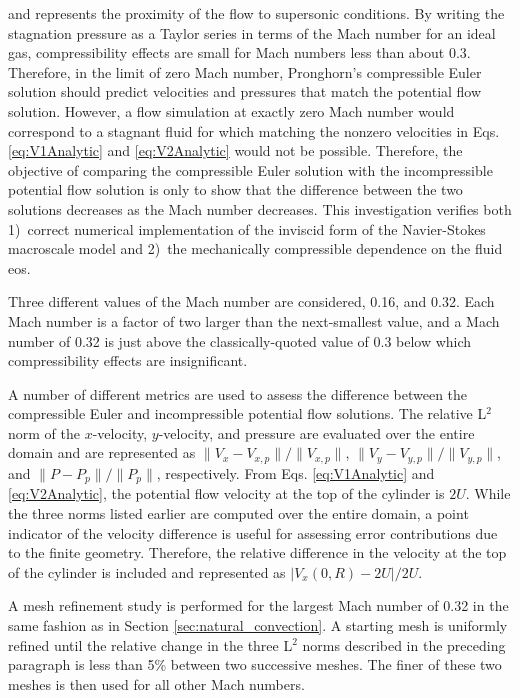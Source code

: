 \noindent and represents the proximity of the flow to supersonic conditions. By writing the stagnation pressure as a Taylor series in terms of the Mach number for an ideal gas, compressibility effects are small for Mach numbers less than about 0.3. Therefore, in the limit of zero Mach number, Pronghorn's compressible Euler solution should predict velocities and pressures that match the potential flow solution. However, a flow simulation at exactly zero Mach number would correspond to a stagnant fluid for which matching the nonzero velocities in Eqs. \eqref{eq:V1Analytic} and \eqref{eq:V2Analytic} would not be possible. Therefore, the objective of comparing the compressible Euler solution with the incompressible potential flow solution is only to show that the difference between the two solutions decreases as the Mach number decreases. This investigation verifies both 1)~correct numerical implementation of the inviscid form of the Navier-Stokes macroscale model and 2)~the mechanically compressible dependence on the fluid \gls{eos}.

Three different values of the Mach number are considered, 0.16, and 0.32. Each Mach number is a factor of two larger than the next-smallest value, and a Mach number of 0.32 is just above the classically-quoted value of 0.3 below which compressibility effects are insignificant.

A number of different metrics are used to assess the difference between the compressible Euler and incompressible potential flow solutions. The relative L$^2$ norm of the $x$-velocity, $y$-velocity, and pressure are evaluated over the entire domain and are represented as \(\|V_x-V_{x,p}\|/\|V_{x,p}\|\), \(\|V_y-V_{y,p}\|/\|V_{y,p}\|\), and \(\|P-P_p\|/\|P_p\|\), respectively. From Eqs. \eqref{eq:V1Analytic} and \eqref{eq:V2Analytic}, the potential flow velocity at the top of the cylinder is \(2U\). While the three norms listed earlier are computed over the entire domain, a point indicator of the velocity difference is useful for assessing error contributions due to the finite geometry. Therefore, the relative difference in the velocity at the top of the cylinder is included and represented as \(|V_x(0, R)-2U|/2U\).

A mesh refinement study is performed for the largest Mach number of 0.32 in the same fashion as in Section \ref{sec:natural_convection}. A starting mesh is uniformly refined until the relative change in the three L$^2$ norms described in the preceding paragraph is less than 5\% between two successive meshes. The finer of these two meshes is then used for all other Mach numbers.

